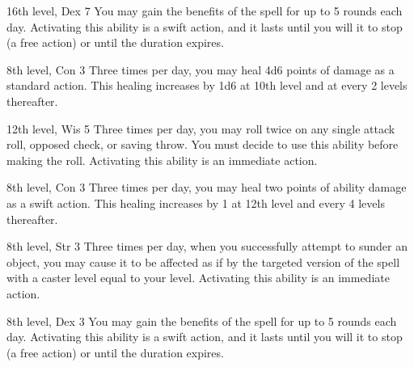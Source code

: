 \featpre 16th level, Dex 7
\featben You may gain the benefits of the  spell for up to 5 rounds each day. Activating this ability is a swift action, and it lasts until you will it to stop (a free action) or until the duration expires.

\featpre 8th level, Con 3
\featben Three times per day, you may heal 4d6 points of damage as a standard action. This healing increases by 1d6 at 10th level and at every 2 levels thereafter.

\featpre 12th level, Wis 5
\featben Three times per day, you may roll twice on any single attack roll, opposed check, or saving throw. You must decide to use this ability before making the roll. Activating this ability is an immediate action.

\featpre 8th level, Con 3
\featben Three times per day, you may heal two points of ability damage as a swift action. This healing increases by 1 at 12th level and every 4 levels thereafter.

\featpre 8th level, Str 3
\featben Three times per day, when you successfully attempt to sunder an object, you may cause it to be affected as if by the targeted version of the  spell with a caster level equal to your level. Activating this ability is an immediate action.

\featpre 8th level, Dex 3
\featben You may gain the benefits of the  spell for up to 5 rounds each day. Activating this ability is a swift action, and it lasts until you will it to stop (a free action) or until the duration expires.
